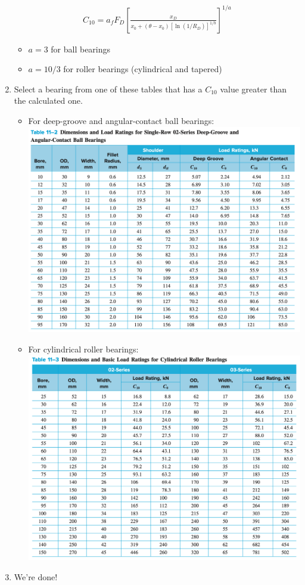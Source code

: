 \documentclass[11pt, fleqn]{article}
\begin{document}
\begin{enumerate}
\begin{align*}
        C_{10} = a_f F_D \left[ \frac{x_D}{x_0+(\theta - x_0)[\ln{(1/R_D)}]^{1/b}} \right]^{1/a}
    \end{align*}
    \begin{itemize}
        \item $a = 3$ for ball bearings
        \item $a = 10/3$ for roller bearings (cylindrical and tapered)
    \end{itemize}
    \item Select a bearing from one of these tables that has a $C_{10}$ value greater than the calculated one.
    \begin{itemize}
        \item For deep-groove and angular-contact ball bearings:\\
        \includegraphics[scale=0.5]{Bearings/deep-groove-table.png}\\
        \item For cylindrical roller bearings:\\
        \includegraphics[scale=0.5]{Bearings/cylindrical-roller-table.png}
    \end{itemize}
    \item We're done!
\end{enumerate}
\end{document}
